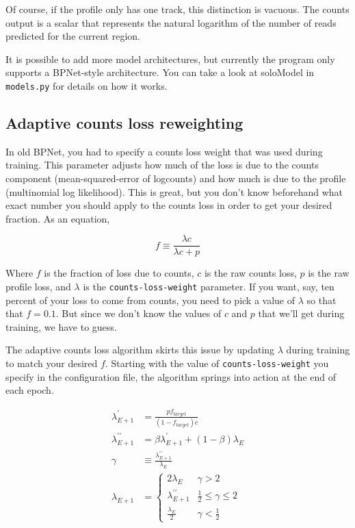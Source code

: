 \documentclass{article}
\begin{document}
Of course, if the profile only has one track, this distinction is vacuous.
The counts output is a scalar that represents the natural logarithm of the number of reads
predicted for the current region.

It is possible to add more model architectures, but currently the program only supports a
BPNet-style architecture.
You can take a look at soloModel in \texttt{models.py} for details on how it works.

\subsection{Adaptive counts loss reweighting}\label{sec:countsLossReweighting}
In old BPNet, you had to specify a counts loss weight that was used during training.
This parameter adjusts how much of the loss is due to the counts component
(mean-squared-error of logcounts) and how much is due to the profile (multinomial
log likelihood).
This is great, but you don't know beforehand what exact number you should apply to
the counts loss in order to get your desired fraction. As an equation,

\begin{equation}
    f \equiv \frac{\lambda c}{\lambda c + p}
\end{equation}

Where $f$ is the fraction of loss due to counts, $c$ is the raw counts loss, $p$ is the
raw profile loss, and $\lambda$ is the \texttt{counts-loss-weight} parameter.
If you want, say, ten percent of your loss to come from counts, you need to pick
a value of $\lambda$ so that that $f = 0.1$.
But since we don't know the values of $c$ and $p$ that we'll get during training,
we have to guess.

The adaptive counts loss algorithm skirts this issue by updating $\lambda$ during training
to match your desired $f$. Starting with the value of \texttt{counts-loss-weight} you
specify in the configuration file, the algorithm springs into action at the end of each epoch.

\begin{align}
    \lambda^\prime_{E+1} &= \frac{p f_{target}}{(1-f_{target}) c} \\
    \lambda^{\prime\prime}_{E+1} &= \beta \lambda^\prime_{E+1} + (1 - \beta) \lambda_{E} \\
    \gamma &\equiv \frac{\lambda^{\prime\prime}_{E+1}}{\lambda_E} \\
    \lambda_{E+1} &= 
    \begin{cases}
        2 \lambda_E & \gamma > 2 \\
        \lambda^{\prime\prime}_{E+1} & \frac{1}{2} \le \gamma \le 2 \\
        \frac{\lambda_E}{2} & \gamma < \frac{1}{2}
    \end{cases}
\end{align}
\end{document}
